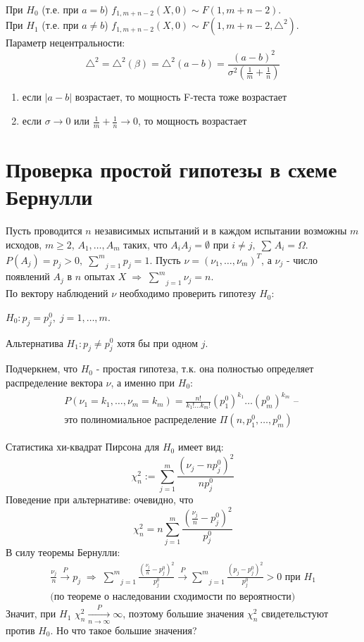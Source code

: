 При $H_0$ (т.е. при $a=b$) $f_{1,m+n-2} (X,0) \sim F(1,m+n-2)$.\\
При $H_1$ (т.е. при $a\not=b$) $f_{1,m+n-2} (X,0) \sim F(1,m+n-2, \triangle^2)$.\\
Параметр нецентральности:
$$\triangle^2 = \triangle^2 (\beta) = \triangle^2 (a-b) = \frac{(a-b)^2}{\sigma^2 \left( \frac{1}{m} + \frac{1}{n} \right)}$$
\begin{enumerate}
	\item если $|a-b|$ возрастает, то мощность F-теста тоже возрастает
	\item если $\sigma \to 0$ или $\frac{1}{m} + \frac{1}{n} \to 0$, то мощность возрастает
\end{enumerate}

\section{Проверка простой гипотезы в схеме Бернулли}\label{lec:7/sec:1}

Пусть проводится $n$ независимых испытаний и в каждом испытании возможны $m$ исходов, $m \ge 2$, $A_1, \dots, A_m$ таких, что $A_i A_j = \emptyset$ при $i \not = j, \; \underset{}{\overset{}{\sum}}A_i = \Omega$. $P(A_j) = p_j > 0, \; \underset{j=1}{\overset{m}{\sum}}p_j = 1$. Пусть $\nu = (\nu_1, \dots, \nu_m)^T$, а $\nu_j$ - число появлений $A_j$ в $n$ опытах $X \; \Rightarrow \; \underset{j=1}{\overset{m}{\sum}}\nu_j = n$.\\
По вектору наблюдений $\nu$ необходимо проверить гипотезу $H_0$:

$H_0: p_j = p_j^0, \; j = 1, \dots, m$. 

Альтернатива $H_1: p_j \not = p_j^0$ хотя бы при одном $j$. 

Подчеркнем, что $H_0$ - простая гипотеза, т.к. она полностью определяет распределение вектора $\nu$, а именно при $H_0$:
$$\begin{gathered}
	P(\nu_1 = k_1, \dots, \nu_m = k_m) = \frac{n!}{k_1! \dots k_m!} (p_1^0)^{k_1} \dots (p_m^0)^{k_m} \text{ -- } \\
	\text{это полиномиальное распределение } \Pi (n, p_1^0, \dots, p_m^0)
\end{gathered}$$ 

Статистика хи-квадрат Пирсона для $H_0$ имеет вид:
$$\chi_n^2 := \underset{j=1}{\overset{m}{\sum}}\frac{(\nu_j - n p_j^0)^2}{n p_j^0}$$
Поведение при альтернативе: очевидно, что
$$\chi_n^2 = n \underset{j=1}{\overset{m}{\sum}}\frac{(\frac{\nu_j}{n} - p_j^0)^2}{p_j^0}$$
В силу теоремы Бернулли:
$$\begin{gathered}
	\frac{\nu_j}{n} \xrightarrow[]{P} p_j \; \Rightarrow \; \underset{j=1}{\overset{m}{\sum}}\frac{(\frac{\nu_j}{n} - p_j^0)^2}{p_j^0} \xrightarrow[]{P} \underset{j=1}{\overset{m}{\sum}}\frac{(p_j - p_j^0)^2}{p_j^0} > 0 \text{ при } H_1 \\
	\text{(по теореме о наследовании сходимости по вероятности)}
\end{gathered}$$
Значит, при $H_1$ $\chi_n^2 \xrightarrow[n \to \infty]{P}\infty$, поэтому большие значения $\chi_n^2$ свидетельстуют против $H_0$. Но что такое большие значения?

